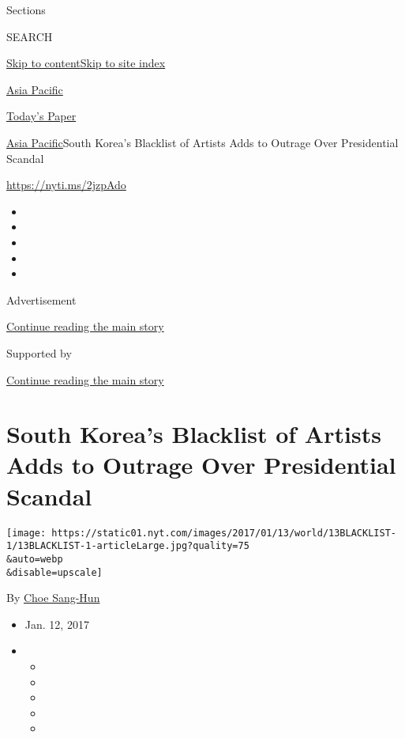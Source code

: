Sections

SEARCH

\protect\hyperlink{site-content}{Skip to
content}\protect\hyperlink{site-index}{Skip to site index}

\href{https://www.nytimes.com/section/world/asia}{Asia Pacific}

\href{https://myaccount.nytimes.com/auth/login?response_type=cookie\&client_id=vi}{}

\href{https://www.nytimes.com/section/todayspaper}{Today's Paper}

\href{/section/world/asia}{Asia Pacific}\textbar{}South Korea's
Blacklist of Artists Adds to Outrage Over Presidential Scandal

\url{https://nyti.ms/2jzpAdo}

\begin{itemize}
\item
\item
\item
\item
\item
\end{itemize}

Advertisement

\protect\hyperlink{after-top}{Continue reading the main story}

Supported by

\protect\hyperlink{after-sponsor}{Continue reading the main story}

\hypertarget{south-koreas-blacklist-of-artists-adds-to-outrage-over-presidential-scandal}{%
\section{South Korea's Blacklist of Artists Adds to Outrage Over
Presidential
Scandal}\label{south-koreas-blacklist-of-artists-adds-to-outrage-over-presidential-scandal}}

\texttt{[image: https://static01.nyt.com/images/2017/01/13/world/13BLACKLIST-1/13BLACKLIST-1-articleLarge.jpg?quality=75\\\&auto=webp\\\&disable=upscale]}

By \href{http://www.nytimes.com/by/choe-sang-hun}{Choe Sang-Hun}

\begin{itemize}
\item
  Jan. 12, 2017
\item
  \begin{itemize}
  \item
  \item
  \item
  \item
  \item
  \end{itemize}
\end{itemize}

